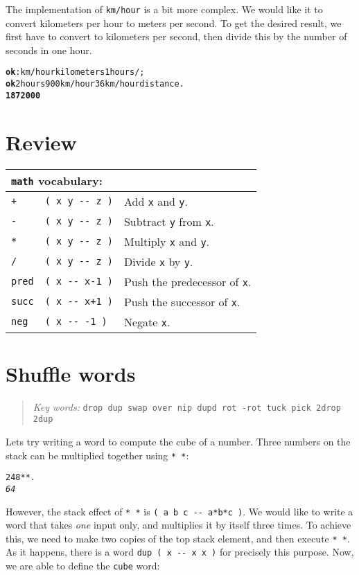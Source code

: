 \documentclass[english]{book}
\newcommand{\chapkeywords}[1]{%
\begin{quote}
\emph{Key words:} \texttt{#1}
\end{quote}
}
\newcommand{\wordtable}[1]{{
\begin{tabularx}{12cm}{|l l X|}
#1
\hline
\end{tabularx}}}
\newcommand{\tabvocab}[1]{
\hline
\multicolumn{3}{|l|}{
\rule[-2mm]{0mm}{6mm}
\texttt{#1} vocabulary:}
\\
\hline
}
\begin{document}
The implementation of \texttt{km/hour} is a bit more complex. We would like it to convert kilometers per hour to meters per second. To get the desired result, we first have to convert to kilometers per second, then divide this by the number of seconds in one hour.

\begin{alltt}
\textbf{ok} : km/hour kilometers 1 hours / ;
\textbf{ok} 2 hours 900 km/hour 36 km/hour distance .
\textbf{1872000}
\end{alltt}

\section*{Review}

\wordtable{
\tabvocab{math}
\texttt{+}&
\texttt{( x y -{}- z )}&
Add \texttt{x} and \texttt{y}.\\
\texttt{-}&
\texttt{( x y -{}- z )}&
Subtract \texttt{y} from \texttt{x}.\\
\texttt{*}&
\texttt{( x y -{}- z )}&
Multiply \texttt{x} and \texttt{y}.\\
\texttt{/}&
\texttt{( x y -{}- z )}&
Divide \texttt{x} by \texttt{y}.\\
\texttt{pred}&
\texttt{( x -{}- x-1 )}&
Push the predecessor of \texttt{x}.\\
\texttt{succ}&
\texttt{( x -{}- x+1 )}&
Push the successor of \texttt{x}.\\
\texttt{neg}&
\texttt{( x -{}- -1 )}&
Negate \texttt{x}.\\
}

\section{Shuffle words}

\chapkeywords{drop dup swap over nip dupd rot -rot tuck pick 2drop 2dup}

Lets try writing a word to compute the cube of a number. 
Three numbers on the stack can be multiplied together using \texttt{{*}
{*}}:

\begin{alltt}
2 4 8 {*} {*} .
\emph{64}
\end{alltt}

However, the stack effect of \texttt{{*} {*}} is \texttt{( a b c -{}-
a{*}b{*}c )}. We would like to write a word that takes \emph{one} input
only, and multiplies it by itself three times. To achieve this, we need to make two copies of the top stack element, and then execute \texttt{{*} {*}}. As it happens, there is a word \texttt{dup ( x -{}-
x x )} for precisely this purpose. Now, we are able to define the
\texttt{cube} word:
\end{document}
